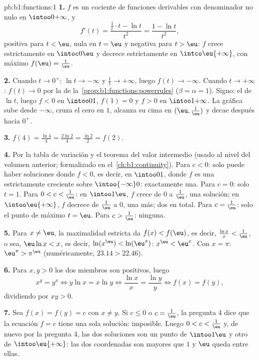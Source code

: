 \begin{solution}{pb:b1:functions:1}
\textbf{1.} $f$ es un cociente de funciones derivables con denominador
no nulo en $\intoo0{+\infty}$, y
\[
f'(t) = \frac{\frac1t \cdot t - \ln t}{t^2} = \frac{1 - \ln
t}{t^2} ,
\]
positiva para $t < \eu$, nula en $t = \eu$ y negativa para $t > \eu$:
$f$ crece estrictamente en $\intoc0\eu$ y decrece estrictamente en
$\intco\eu{+\infty}$, con máximo $f(\eu) = \frac1\eu$.

\textbf{2.} Cuando $t \to 0^+$: $\ln t \to -\infty$ y
$\frac1t \to +\infty$, luego $f(t) \to -\infty$. Cuando
$t \to +\infty$: $f(t) \to 0$ por la 
de la~\cref{prop:b1:functions:powerrules} ($\beta = \alpha = 1$).
Signo: el de $\ln t$, luego $f < 0$ en $\intoo01$, $f(1) = 0$ y $f > 0$
en $\intoo1{+\infty}$. La gráfica sube desde $-\infty$, cruza el cero
en $1$, alcanza su cima en $(\eu, \frac1\eu)$ y decae después hacia
$0^+$.

\textbf{3.} $f(4) = \frac{\ln 4}4 = \frac{2\ln 2}4 = \frac{\ln 2}2
= f(2)$.

\textbf{4.} Por la tabla de variación y el teorema del valor intermedio
(usado al nivel del volumen anterior; formalizado en
el~\cref{ch:b1:continuity}). Para $c < 0$: solo puede haber soluciones
donde $f < 0$, es decir, en $\intoo01$, donde $f$ es una 
estrictamente creciente sobre $\intoo{-\infty}0$: exactamente una. Para
$c = 0$: solo $t = 1$. Para $0 < c < \frac1\eu$: en $\intoo1\eu$, $f$
crece de $0$ a $\frac1\eu$, una solución; en $\intoo\eu{+\infty}$, $f$
decrece de $\frac1\eu$ a $0$, una más; dos en total. Para
$c = \frac1\eu$: solo el punto de máximo $t = \eu$. Para
$c > \frac1\eu$: ninguna.

\textbf{5.} Para $x \neq \eu$, la maximalidad estricta da
$f(x) < f(\eu)$, es decir, $\frac{\ln x}x < \frac1\eu$, o sea,
$\eu\ln x < x$, es decir, $\ln(x^\eu) < \ln(\eu^x)$: $x^\eu < \eu^x$.
Con $x = \pi$: $\eu^\pi > \pi^\eu$ (numéricamente, $23.14 > 22.46$).

\textbf{6.} Para $x, y > 0$ los dos miembros son positivos, luego
\[
x^y = y^x \iff y\ln x = x\ln y \iff \frac{\ln x}x = \frac{\ln y}y
\iff f(x) = f(y) ,
\]
dividiendo por $xy > 0$.

\textbf{7.} Sea $f(x) = f(y) = c$ con $x \neq y$. Si $c \leq 0$ o
$c = \frac1\eu$, la pregunta 4 dice que la ecuación $f = c$ tiene una
sola solución: imposible. Luego $0 < c < \frac1\eu$ y, de nuevo por la
pregunta 4, las dos soluciones son un punto de $\intoo1\eu$ y otro de
$\intoo\eu{+\infty}$: las dos coordenadas son mayores que $1$ y $\eu$
queda entre ellas.


\end{solution}
